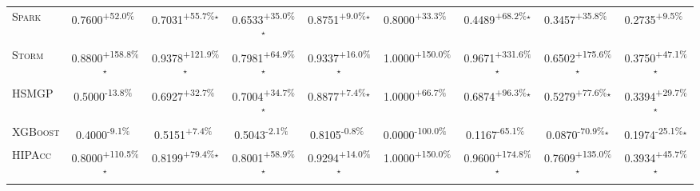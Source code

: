 \begin{table}[htbp]
\begin{tabular}{l|cccc|cccc}
\textsc{Spark} & \cellcolor{green!30}0.7600\textsuperscript{+52.0\%}$^{\,\,\,}$ & \cellcolor{green!30}0.7031\textsuperscript{+55.7\%}$^\star$ & \cellcolor{green!30}0.6533\textsuperscript{+35.0\%}$^\star$ & \cellcolor{green!30}0.8751\textsuperscript{+9.0\%}$^\star$ & \cellcolor{green!30}0.8000\textsuperscript{+33.3\%}$^{\,\,\,}$ & \cellcolor{green!30}0.4489\textsuperscript{+68.2\%}$^\star$ & \cellcolor{green!30}0.3457\textsuperscript{+35.8\%}$^{\,\,\,}$ & \cellcolor{green!30}0.2735\textsuperscript{+9.5\%}$^{\,\,\,}$ \\
\textsc{Storm} & \cellcolor{green!30}0.8800\textsuperscript{+158.8\%}$^\star$ & \cellcolor{green!30}0.9378\textsuperscript{+121.9\%}$^\star$ & \cellcolor{green!30}0.7981\textsuperscript{+64.9\%}$^\star$ & \cellcolor{green!30}0.9337\textsuperscript{+16.0\%}$^\star$ & \cellcolor{green!30}1.0000\textsuperscript{+150.0\%}$^{\,\,\,}$ & \cellcolor{green!30}0.9671\textsuperscript{+331.6\%}$^\star$ & \cellcolor{green!30}0.6502\textsuperscript{+175.6\%}$^\star$ & \cellcolor{green!30}0.3750\textsuperscript{+47.1\%}$^\star$ \\
\textsc{HSMGP} & \cellcolor{red!30}0.5000\textsuperscript{-13.8\%}$^{\,\,\,}$ & \cellcolor{green!30}0.6927\textsuperscript{+32.7\%}$^{\,\,\,}$ & \cellcolor{green!30}0.7004\textsuperscript{+34.7\%}$^\star$ & \cellcolor{green!30}0.8877\textsuperscript{+7.4\%}$^\star$ & \cellcolor{green!30}1.0000\textsuperscript{+66.7\%}$^{\,\,\,}$ & \cellcolor{green!30}0.6874\textsuperscript{+96.3\%}$^\star$ & \cellcolor{green!30}0.5279\textsuperscript{+77.6\%}$^\star$ & \cellcolor{green!30}0.3394\textsuperscript{+29.7\%}$^\star$ \\
\textsc{XGBoost} & \cellcolor{red!30}0.4000\textsuperscript{-9.1\%}$^{\,\,\,}$ & \cellcolor{green!30}0.5151\textsuperscript{+7.4\%}$^{\,\,\,}$ & \cellcolor{red!30}0.5043\textsuperscript{-2.1\%}$^{\,\,\,}$ & \cellcolor{red!30}0.8105\textsuperscript{-0.8\%}$^{\,\,\,}$ & \cellcolor{red!30}0.0000\textsuperscript{-100.0\%}$^{\,\,\,}$ & \cellcolor{red!30}0.1167\textsuperscript{-65.1\%}$^{\,\,\,}$ & \cellcolor{red!30}0.0870\textsuperscript{-70.9\%}$^\star$ & \cellcolor{red!30}0.1974\textsuperscript{-25.1\%}$^\star$ \\
\textsc{HIPAcc} & \cellcolor{green!30}0.8000\textsuperscript{+110.5\%}$^\star$ & \cellcolor{green!30}0.8199\textsuperscript{+79.4\%}$^\star$ & \cellcolor{green!30}0.8001\textsuperscript{+58.9\%}$^\star$ & \cellcolor{green!30}0.9294\textsuperscript{+14.0\%}$^\star$ & \cellcolor{green!30}1.0000\textsuperscript{+150.0\%}$^{\,\,\,}$ & \cellcolor{green!30}0.9600\textsuperscript{+174.8\%}$^\star$ & \cellcolor{green!30}0.7609\textsuperscript{+135.0\%}$^\star$ & \cellcolor{green!30}0.3934\textsuperscript{+45.7\%}$^\star$ \\

\end{tabular}
\end{table}
